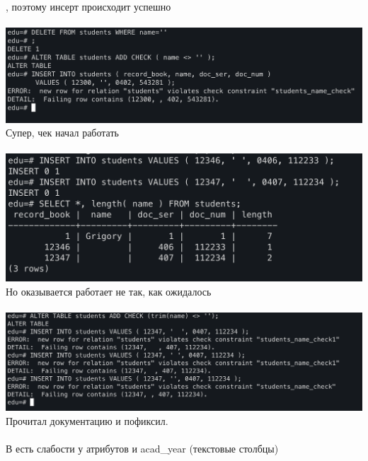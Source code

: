 \documentclass[a4paper,12pt]{article}
\begin{document}
, поэтому инсерт происходит успешно
\\\\
\includegraphics[scale=0.5]{92.png}
\\
Супер, чек начал работать
\\\\
\includegraphics[scale=0.5]{93.png}
\\
Но оказывается работает не так, как ожидалось
\\\\
\includegraphics[scale=0.5]{94.png}
\\
Прочитал документацию и пофиксил.
\\\\
В  есть слабости у атрибутов  и acad\_year (текстовые столбцы)
\clearpage
\end{document}
